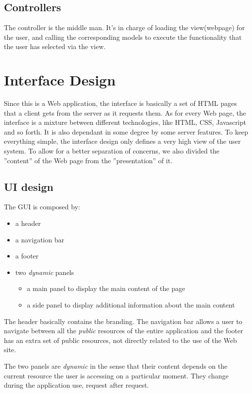 \documentclass[12pt]{report}
\begin{document}
\subsection{Controllers}
The controller is the middle man. It's in charge of loading the view(webpage) for the user, and calling the corresponding models to execute the functionality that the user has selected via the view. 

\section{Interface Design}
Since this is a Web application, the interface is basically a set of HTML pages that a client gets from the server as it requests them. As for every Web page, the interface is a mixture between different technologies, like HTML, CSS, Javascript and so forth. It is also dependant in some degree by some server features. To keep everything simple, the interface design only defines a very high view of the user system. To allow for a better separation of concerns, we also divided the ''content'' of the Web page from the ''presentation'' of it.
\subsection{UI design}
The GUI is composed by:
\begin{itemize}
\item a header
\item a navigation bar
\item a footer
\item two \emph{dynamic} panels
	\begin{itemize}
	\item a main panel to display the main content of the page
    \item a side panel to display additional information about the main content
	\end{itemize}
\end{itemize}
The header basically contains the branding. The navigation bar allows a user to navigate between all the \emph{public} resources of the entire application and the footer has an extra set of public resources, not directly related to the use of the Web site.

The two panels are \emph{dynamic} in the sense that their content depends on the current resource the user is accessing on a particular moment. They change during the application use, request after request.
\end{document}
